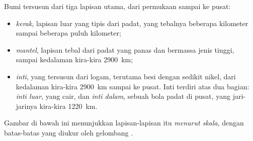 \begin{definition}\label{def:g6:inside-the-earth:layers}
Bumi tersusun dari tiga lapisan utama, dari permukaan sampai ke pusat:
\begin{itemize}
  \item \emph{kerak}, lapisan luar yang tipis dari  padat,
        yang tebalnya beberapa kilometer sampai beberapa puluh kilometer;
  \item \emph{mantel}, lapisan tebal dari  padat yang
        panas dan bermassa jenis tinggi, sampai kedalaman kira-kira 2900~km;
  \item \emph{inti}, yang tersusun dari logam, terutama besi
        dengan sedikit nikel, dari kedalaman kira-kira 2900~km sampai ke
        pusat. Inti terdiri atas dua bagian: \emph{inti luar},
        yang cair, dan \emph{inti dalam}, sebuah bola padat
        di pusat, yang jari-jarinya kira-kira 1220~km.
\end{itemize}
\end{definition}

Gambar di bawah ini menunjukkan lapisan-lapisan itu \emph{menurut skala},
dengan batas-batas yang diukur oleh gelombang .

